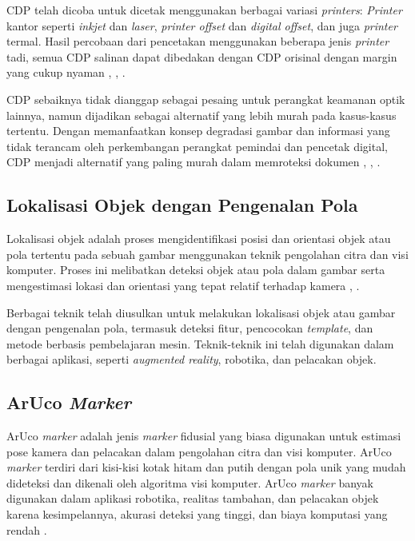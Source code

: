 CDP telah dicoba untuk dicetak menggunakan berbagai variasi \emph{printers}: \emph{Printer} kantor seperti \emph{inkjet} dan \emph{laser}, \emph{printer
	offset} dan \emph{digital offset}, dan juga \emph{printer} termal. Hasil percobaan dari pencetakan menggunakan beberapa jenis \emph{printer} tadi, semua CDP
salinan dapat dibedakan dengan CDP orisinal dengan margin yang cukup nyaman \cite{picard2004digital}, \cite{picard2004towards}, \cite{harwood1998optical}.

CDP sebaiknya tidak dianggap sebagai pesaing untuk perangkat keamanan optik lainnya, namun dijadikan sebagai alternatif yang lebih murah pada kasus-kasus
tertentu. Dengan memanfaatkan konsep degradasi gambar dan informasi yang tidak terancam oleh perkembangan perangkat pemindai dan pencetak digital, CDP menjadi
alternatif yang paling murah dalam memroteksi dokumen \cite{picard2004digital}, \cite{picard2004towards}, \cite{harwood1998optical}.

\subsection{Lokalisasi Objek dengan Pengenalan Pola}
Lokalisasi objek adalah proses mengidentifikasi posisi dan orientasi objek atau pola tertentu pada sebuah gambar menggunakan teknik pengolahan citra dan visi
komputer. Proses ini melibatkan deteksi objek atau pola dalam gambar serta mengestimasi lokasi dan orientasi yang tepat relatif terhadap kamera
\cite{sivic2003video}, \cite{liu2016ssd}.

Berbagai teknik telah diusulkan untuk melakukan lokalisasi objek atau gambar dengan pengenalan pola, termasuk deteksi fitur, pencocokan \emph{template}, dan
metode berbasis pembelajaran mesin. Teknik-teknik ini telah digunakan dalam berbagai aplikasi, seperti \emph{augmented reality}, robotika, dan pelacakan objek.

\subsection{ArUco \emph{Marker}}
ArUco \emph{marker} adalah jenis \emph{marker} fidusial yang biasa digunakan untuk estimasi pose kamera dan pelacakan dalam pengolahan citra dan visi komputer. ArUco \emph{marker} terdiri dari kisi-kisi kotak hitam dan putih dengan pola unik yang mudah dideteksi dan dikenali oleh algoritma visi komputer. ArUco \emph{marker} banyak digunakan dalam aplikasi robotika, realitas tambahan, dan pelacakan objek karena kesimpelannya, akurasi deteksi yang tinggi, dan biaya komputasi yang rendah \cite{arucoopencv}.

